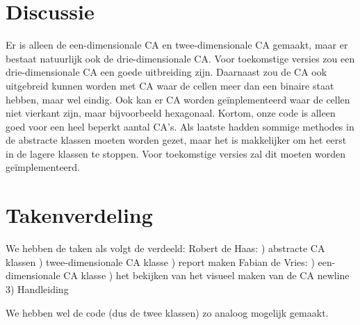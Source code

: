 \documentclass[12pt,a4paper]{article}
\begin{document}
\section*{Discussie}
Er is alleen de een-dimensionale CA en twee-dimensionale 
CA gemaakt, maar er bestaat natuurlijk ook de drie-dimensionale CA.
Voor toekomstige versies zou een drie-dimensionale CA een goede uitbreiding zijn.
Daarnaast zou de CA ook uitgebreid kunnen worden met CA waar de cellen meer dan een binaire staat hebben, maar wel eindig.
Ook kan er CA worden geïnplementeerd waar de cellen niet vierkant zijn, maar bijvoorbeeld hexagonaal.
Kortom, onze code is alleen goed voor een heel beperkt aantal CA's.
Als laatste hadden sommige methodes in de abstracte klassen moeten worden gezet, maar het 
is makkelijker om het eerst in de lagere klassen te stoppen.
Voor toekomstige versies zal dit moeten worden geïmplementeerd.  

\newpage
\section*{Takenverdeling}
We hebben de taken als volgt de verdeeld:
\vspace{6pt}
\newline
Robert de Haas:
) abstracte CA klassen
) twee-dimensionale CA klasse
) report maken
\vspace{6pt}
\newline
Fabian de Vries:
) een-dimensionale CA klasse
) het bekijken van het visueel maken van de CA
newline
3) Handleiding 


We hebben wel de code (dus de twee klassen) zo analoog mogelijk gemaakt.

  
\end{document}
